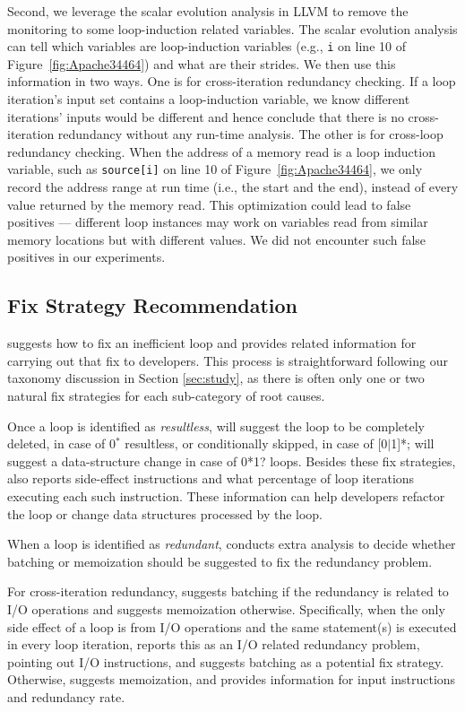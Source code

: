 Second, we leverage the scalar evolution analysis in LLVM to remove the 
monitoring to some loop-induction related variables.
The scalar evolution analysis can tell which variables are
loop-induction variables (e.g., \texttt{i} on line 10
of Figure~\ref{fig:Apache34464}) and what are their strides. 
We then use this information in two ways. 
One is for cross-iteration redundancy checking.
If a loop iteration's input set contains a loop-induction
variable, we know different iterations' inputs would be different and 
hence conclude that there is no cross-iteration redundancy without any
run-time analysis. 
The other is for cross-loop redundancy checking.
When the address of a memory read is a loop induction variable, such as
\texttt{source[i]} on line 10 of Figure~\ref{fig:Apache34464},
we only record the address range at run time (i.e., the start and the
end), instead of every value returned by the memory read.
This optimization could lead to false positives ---
different loop instances may work on variables read from
similar memory locations but with different values.
We did not encounter such false positives in our experiments.


\subsection{Fix Strategy Recommendation}
\label{sec:redundant_fix}

\Tool suggests how to fix an inefficient loop 
{\color{red} and provides related information for carrying out that fix} 
to developers.
This process is straightforward following our taxonomy discussion in 
Section \ref{sec:study}, as there is often only one or two natural fix 
strategies for each sub-category of root causes.

Once a loop is identified as \emph{resultless}, \Tool will suggest
the loop to be completely deleted, in case of 0$^*$ resultless, or
conditionally skipped, in case of [0$|$1]*; \Tool will suggest a 
data-structure change in case of 0*1? loops.
{\color{red}Besides these fix strategies, \Tool also reports side-effect instructions 
and what percentage of loop iterations executing each such instruction. 
These information can help developers refactor the loop or change data structures processed by the loop. }

When a loop is identified as \emph{redundant}, \Tool conducts
extra analysis to
decide whether batching or memoization should be suggested to fix the
redundancy problem. 

For cross-iteration redundancy, \Tool suggests batching if the
redundancy is related to I/O operations and suggests memoization otherwise.
Specifically, 
when the only side effect of a loop is from I/O operations
and the same statement(s) is executed in every loop iteration, \Tool reports 
this
as an I/O related redundancy problem, 
{\color{red}pointing out I/O instructions,} 
and suggests batching as a potential fix
strategy. Otherwise, \Tool suggests memoization, 
{\color{red}and provides information for input instructions and redundancy rate.}

